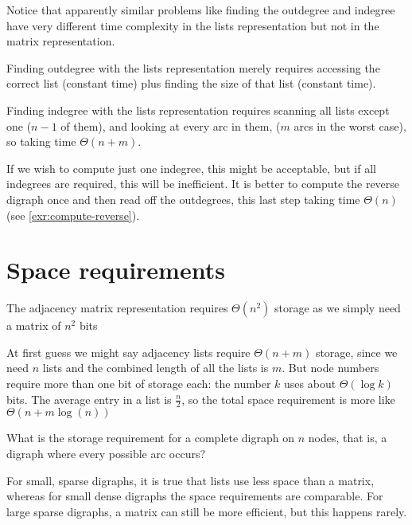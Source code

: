 Notice that apparently similar problems like finding the outdegree and indegree have very different time complexity in the lists representation but not in the matrix representation. 

Finding outdegree with the lists representation merely requires accessing
the correct list (constant time) plus finding the size of  that list
(constant time). 

Finding indegree with the  lists representation requires
scanning all lists except one ($n-1$ of them), and looking at every arc in
them, ($m$ arcs in the worst case), so taking time $\Theta(n+m)$. 


If we wish to compute just one indegree, this might be acceptable, but if all indegrees are required,
this will be inefficient. It is better to compute the reverse digraph once
and then read off the outdegrees, this last step taking time $\Theta(n)$ 
(see \cref{exr:compute-reverse}).




\section{Space requirements}


The adjacency matrix
representation requires $\Theta(n^2)$ storage as we simply need a matrix of $n^2$
bits 

At first guess we might say adjacency lists require
$\Theta(n+m)$ storage, since we need $n$ lists and the combined length of all the lists is $m$.
But node numbers require more than one bit of storage each: the number $k$ uses about  $\Theta(\log k)$ bits. The average entry in a list is $\frac n 2$, so the total space requirement is more like $\Theta(n+m \log(n))$ 


\begin{Boxample}[2]
What is the storage requirement for a complete digraph on $n$ nodes, that is, a digraph where every possible arc
occurs?
\end{Boxample}

For small, sparse digraphs,
it is true that lists use less space than a matrix, whereas for small
dense digraphs the space requirements are comparable. For large sparse
digraphs, a matrix can still be more efficient, but this happens rarely.

